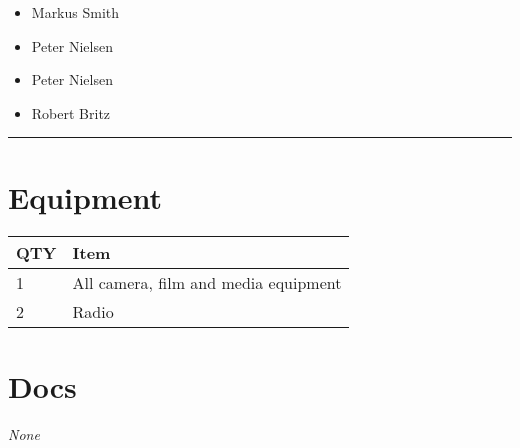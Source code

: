 \documentclass[10pt]{article}
\begin{document}
	\begin{multicols}{2}

		\begin{itemize}
									\item Markus Smith
									\item Peter Nielsen
						\end{itemize}

		\vfill\null
		\columnbreak

		\begin{itemize}
									\item Peter Nielsen
									\item Robert Britz
						\end{itemize}

		\vfill\null

		\end{multicols}



			\vspace{0.5cm}
	\hrule
	\vspace{0.5cm}

	\begin{multicols}{2}

		\section*{\faWrench \: Equipment}

		
	\begin{center}
			\begin{tabular}{p{2cm}p{4cm}}


				\textbf{QTY} & \textbf{Item} \\\toprule
												1&All camera, film and media equipment\\\midrule
												2&Radio\\\midrule
								\end{tabular}

			\end{center}

		
		\vfill\null
		\columnbreak

			\section*{\faFile \: Docs}
		 	\textit{None}
	

		\vfill\null

		\end{multicols}
\end{document}
